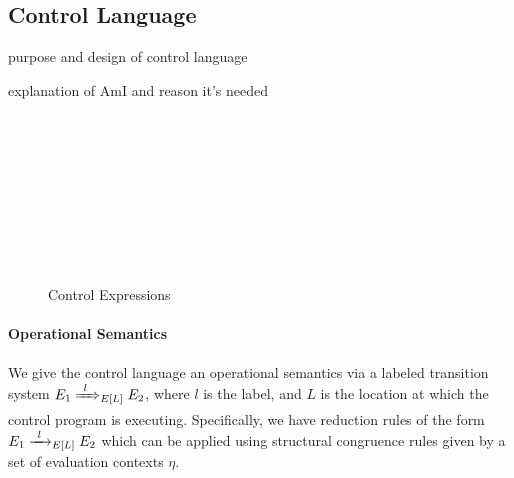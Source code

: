 \subsection{Control Language}
\label{sec:control-lang}

\todo purpose and design of control language

\todo explanation of AmI and reason it's needed

\begin{figure}
  \begin{syntax}
     \alternative{\CtrlFail}   \\
       \\
      \\
     \alternative{\RecvFrom{\ell}} \\
     \\
     \\
     \\
    \\

    \alternative{\CtrlFail}  

    \alternative{\CtrlNone}

    \abstractCategory[Systems]{\Pi}
  \end{syntax}

  \caption{Control Expressions}
  \label{fig:control-lang-syntax}
\end{figure}

\paragraph{Operational Semantics}
\label{sec:control-lang-semantics}
We give the control language an operational semantics via a labeled transition system $E_1 \ctrlstep[l] E_2$, where $l$ is the label, and $L$ is the location at which the control program is executing.
Specifically, we have reduction rules of the form $E_1 \ctrlreduce[l] E_2$ which can be applied using structural congruence rules given by a set of evaluation contexts $\eta$.

